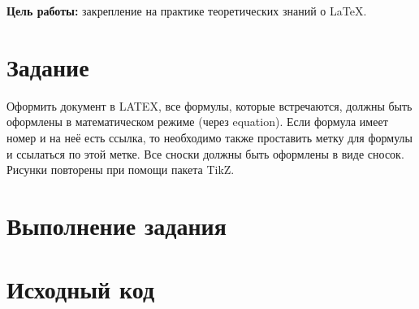 \documentclass[a4paper, 14pt]{article}
\begin{document}
    \graphicspath{{images/}{images2/}} %
    \renewcommand{\figurename}{Рисунок}

    \author{М.А.Гейне}
    \bmstutitlehome

    \textbf{Цель работы:} закрепление на практике теоретических знаний о \LaTeX.
    \section*{Задание}
    Оформить документ в LATEX, все формулы, которые встречаются, должны быть оформлены в математическом режиме (через equation).
    Если формула имеет номер и на неё есть ссылка, то необходимо также
    проставить метку для формулы и ссылаться по этой метке. Все сноски
    должны быть оформлены в виде сносок. Рисунки повторены при помощи
    пакета TikZ.
    
    \section*{Выполнение задания}
    
    \section*{Исходный код}
\end{document}

